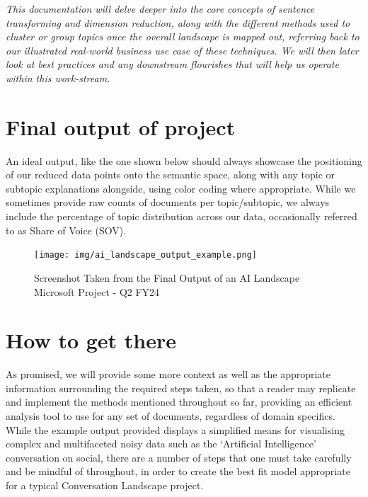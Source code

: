 \documentclass[
  letterpaper,
  DIV=11,
  numbers=noendperiod]{scrreprt}
\begin{document}
\begin{tcolorbox}[enhanced jigsaw, opacitybacktitle=0.6, breakable, title=\textcolor{quarto-callout-note-color}{\faInfo}\hspace{0.5em}{Note}, arc=.35mm, colframe=quarto-callout-note-color-frame, colbacktitle=quarto-callout-note-color!10!white, left=2mm, bottomrule=.15mm, opacityback=0, toprule=.15mm, bottomtitle=1mm, toptitle=1mm, titlerule=0mm, leftrule=.75mm, colback=white, rightrule=.15mm, coltitle=black]

\emph{This documentation will delve deeper into the core concepts of
sentence transforming and dimension reduction, along with the different
methods used to cluster or group topics once the overall landscape is
mapped out, referring back to our illustrated real-world business use
case of these techniques. We will then later look at best practices and
any downstream flourishes that will help us operate within this
work-stream.}

\end{tcolorbox}

\section{Final output of project}\label{final-output-of-project}

An ideal output, like the one shown below should always showcase the
positioning of our reduced data points onto the semantic space, along
with any topic or subtopic explanations alongside, using color coding
where appropriate. While we sometimes provide raw counts of documents
per topic/subtopic, we always include the percentage of topic
distribution across our data, occasionally referred to as Share of Voice
(SOV).

\begin{figure}[H]

{\centering \texttt{[image: img/ai\_landscape\_output\_example.png]}

}

\caption{Screenshot Taken from the Final Output of an AI Landscape
Microsoft Project - Q2 FY24}

\end{figure}%

\section{How to get there}\label{how-to-get-there}

As promised, we will provide some more context as well as the
appropriate information surrounding the required steps taken, so that a
reader may replicate and implement the methods mentioned throughout so
far, providing an efficient analysis tool to use for any set of
documents, regardless of domain specifics. While the example output
provided displays a simplified means for visualising complex and
multifaceted noisy data such as the `Artificial Intelligence'
conversation on social, there are a number of steps that one must take
carefully and be mindful of throughout, in order to create the best fit
model appropriate for a typical Conversation Landscape project.
\end{document}

